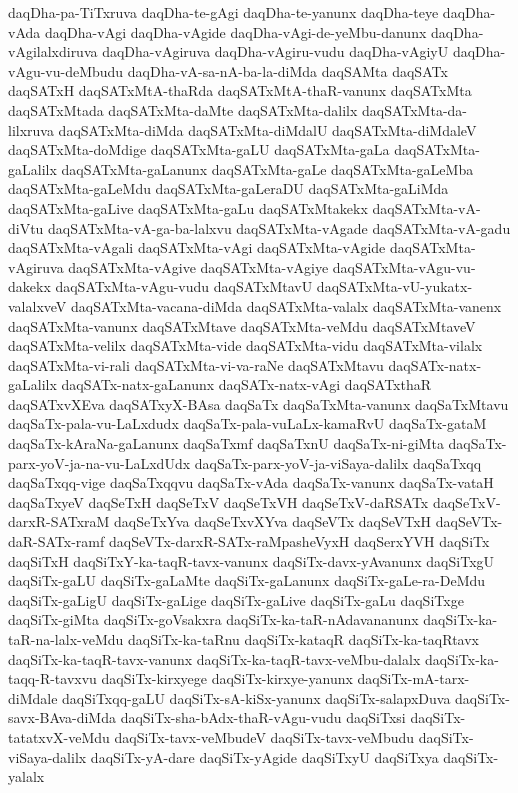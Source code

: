 {daqDha-pa-TiTxruva
daqDha-te-gAgi
daqDha-te-yanunx
daqDha-teye
daqDha-vAda
daqDha-vAgi
daqDha-vAgide
daqDha-vAgi-de-yeMbu-danunx
daqDha-vAgilalxdiruva
daqDha-vAgiruva
daqDha-vAgiru-vudu
daqDha-vAgiyU
daqDha-vAgu-vu-deMbudu
daqDha-vA-sa-nA-ba-la-diMda
daqSAMta
daqSATx
daqSATxH
daqSATxMtA-thaRda
daqSATxMtA-thaR-vanunx
daqSATxMta
daqSATxMtada
daqSATxMta-daMte
daqSATxMta-dalilx
daqSATxMta-da-lilxruva
daqSATxMta-diMda
daqSATxMta-diMdalU
daqSATxMta-diMdaleV
daqSATxMta-doMdige
daqSATxMta-gaLU
daqSATxMta-gaLa
daqSATxMta-gaLalilx
daqSATxMta-gaLanunx
daqSATxMta-gaLe
daqSATxMta-gaLeMba
daqSATxMta-gaLeMdu
daqSATxMta-gaLeraDU
daqSATxMta-gaLiMda
daqSATxMta-gaLive
daqSATxMta-gaLu
daqSATxMtakekx
daqSATxMta-vA-diVtu
daqSATxMta-vA-ga-ba-lalxvu
daqSATxMta-vAgade
daqSATxMta-vA-gadu
daqSATxMta-vAgali
daqSATxMta-vAgi
daqSATxMta-vAgide
daqSATxMta-vAgiruva
daqSATxMta-vAgive
daqSATxMta-vAgiye
daqSATxMta-vAgu-vu-dakekx
daqSATxMta-vAgu-vudu
daqSATxMtavU
daqSATxMta-vU-yukatx-valalxveV
daqSATxMta-vacana-diMda
daqSATxMta-valalx
daqSATxMta-vanenx
daqSATxMta-vanunx
daqSATxMtave
daqSATxMta-veMdu
daqSATxMtaveV
daqSATxMta-velilx
daqSATxMta-vide
daqSATxMta-vidu
daqSATxMta-vilalx
daqSATxMta-vi-rali
daqSATxMta-vi-va-raNe
daqSATxMtavu
daqSATx-natx-gaLalilx
daqSATx-natx-gaLanunx
daqSATx-natx-vAgi
daqSATxthaR
daqSATxvXEva
daqSATxyX-BAsa
daqSaTx
daqSaTxMta-vanunx
daqSaTxMtavu
daqSaTx-pala-vu-LaLxdudx
daqSaTx-pala-vuLaLx-kamaRvU
daqSaTx-gataM
daqSaTx-kAraNa-gaLanunx
daqSaTxmf
daqSaTxnU
daqSaTx-ni-giMta
daqSaTx-parx-yoV-ja-na-vu-LaLxdUdx
daqSaTx-parx-yoV-ja-viSaya-dalilx
daqSaTxqq
daqSaTxqq-vige
daqSaTxqqvu
daqSaTx-vAda
daqSaTx-vanunx
daqSaTx-vataH
daqSaTxyeV
daqSeTxH
daqSeTxV
daqSeTxVH
daqSeTxV-daRSATx
daqSeTxV-darxR-SATxraM
daqSeTxYva
daqSeTxvXYva
daqSeVTx
daqSeVTxH
daqSeVTx-daR-SATx-ramf
daqSeVTx-darxR-SATx-raMpasheVyxH
daqSerxYVH
daqSiTx
daqSiTxH
daqSiTxY-ka-taqR-tavx-vanunx
daqSiTx-davx-yAvanunx
daqSiTxgU
daqSiTx-gaLU
daqSiTx-gaLaMte
daqSiTx-gaLanunx
daqSiTx-gaLe-ra-DeMdu
daqSiTx-gaLigU
daqSiTx-gaLige
daqSiTx-gaLive
daqSiTx-gaLu
daqSiTxge
daqSiTx-giMta
daqSiTx-goVsakxra
daqSiTx-ka-taR-nAdavananunx
daqSiTx-ka-taR-na-lalx-veMdu
daqSiTx-ka-taRnu
daqSiTx-kataqR
daqSiTx-ka-taqRtavx
daqSiTx-ka-taqR-tavx-vanunx
daqSiTx-ka-taqR-tavx-veMbu-dalalx
daqSiTx-ka-taqq-R-tavxvu
daqSiTx-kirxyege
daqSiTx-kirxye-yanunx
daqSiTx-mA-tarx-diMdale
daqSiTxqq-gaLU
daqSiTx-sA-kiSx-yanunx
daqSiTx-salapxDuva
daqSiTx-savx-BAva-diMda
daqSiTx-sha-bAdx-thaR-vAgu-vudu
daqSiTxsi
daqSiTx-tatatxvX-veMdu
daqSiTx-tavx-veMbudeV
daqSiTx-tavx-veMbudu
daqSiTx-viSaya-dalilx
daqSiTx-yA-dare
daqSiTx-yAgide
daqSiTxyU
daqSiTxya
daqSiTx-yalalx
}
